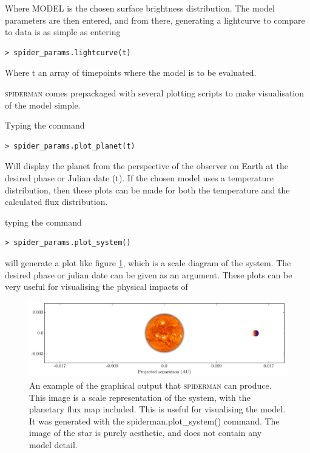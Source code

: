 \documentclass[a4paper,fleqn,usenatbib]{mnras}
\begin{document}
Where MODEL is the chosen surface brightness distribution. The model parameters are then entered, and from there, generating a lightcurve to compare to data is as simple as entering

\begin{Verbatim}[frame=single]
> spider_params.lightcurve(t)
\end{Verbatim}

Where t an array of timepoints where the model is to be evaluated.

\textsc{spiderman} comes prepackaged with several plotting scripts to make visualisation of the model simple.

Typing the command

\begin{Verbatim}[frame=single]
> spider_params.plot_planet(t)
\end{Verbatim}

Will display the planet from the perspective of the observer on Earth at the desired phase or Julian date (t). If the chosen model uses a temperature distribution, then these plots can be made for both the temperature and the calculated flux distribution.


typing the command

\begin{Verbatim}[frame=single]
> spider_params.plot_system()
\end{Verbatim}

will generate a plot like figure \ref{fig:plot_system}, which is a scale diagram of the system. The desired phase or julian date can be given as an argument. These plots can be very useful for visualising the physical impacts of

\begin{figure}
\begin{center}
\includegraphics[width=\textwidth]{img/system.pdf}
\caption{An example of the graphical output that \textsc{spiderman} can produce. This image is a scale representation of the system, with the planetary flux map included. This is useful for visualising the model. It was generated with the spiderman.plot\_system() command. The image of the star is purely aesthetic, and does not contain any model detail.}
\label{fig:plot_system}
\end{center}
\end{figure}
\end{document}

